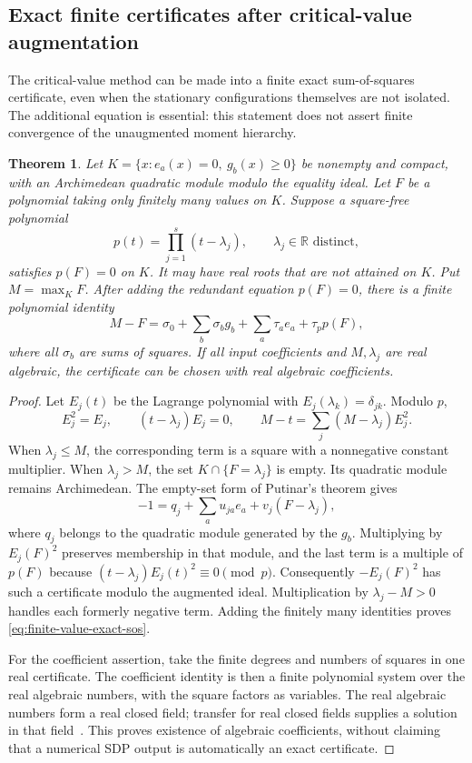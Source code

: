\documentclass[11pt]{article}
\newtheorem{theorem}{Theorem}[section]
\theoremstyle{remark}
\newcommand{\R}{\mathbb R}
\numberwithin{equation}{section}
\begin{document}
\subsection{Exact finite certificates after critical-value augmentation}
\label{sec:finite-value-sos}

The critical-value method can be made into a finite exact
sum-of-squares certificate, even when the stationary configurations
themselves are not isolated. The additional equation is essential:
this statement does not assert finite convergence of the unaugmented
moment hierarchy.

\begin{theorem}\label{thm:finite-value-sos}
Let $K=\{x:e_a(x)=0,\ g_b(x)\ge0\}$ be nonempty and compact,
with an Archimedean quadratic module modulo the equality ideal.
Let $F$ be a polynomial taking only finitely many values on $K$.
Suppose a square-free polynomial
\[
                  p(t)=\prod_{j=1}^s(t-\lambda_j),
                 \qquad \lambda_j\in\R\text{ distinct},
\]
satisfies $p(F)=0$ on $K$. It may have real roots that are not
attained on $K$. Put $M=\max_K F$. After adding the redundant
equation $p(F)=0$, there is a finite polynomial identity
\begin{equation}\label{eq:finite-value-exact-sos}
 M-F=\sigma_0+\sum_b\sigma_b g_b+\sum_a\tau_a e_a
                              +\tau_p p(F),
\end{equation}
where all $\sigma_b$ are sums of squares.
If all input coefficients and $M,\lambda_j$ are real algebraic,
the certificate can be chosen with real algebraic coefficients.
\end{theorem}
\begin{proof}
Let $E_j(t)$ be the Lagrange polynomial with
$E_j(\lambda_k)=\delta_{jk}$. Modulo $p$,
\[
 E_j^2=E_j,\qquad (t-\lambda_j)E_j=0,\qquad
              M-t=\sum_j(M-\lambda_j)E_j^2.
\]
When $\lambda_j\le M$, the corresponding term is a square with
a nonnegative constant multiplier. When $\lambda_j>M$, the set
$K\cap\{F=\lambda_j\}$ is empty. Its quadratic module remains
Archimedean. The empty-set form of Putinar's theorem gives
\[
 -1=q_j+\sum_a u_{ja}e_a+v_j(F-\lambda_j),
\]
where $q_j$ belongs to the quadratic module generated by the $g_b$.
Multiplying by $E_j(F)^2$ preserves membership in that module, and
the last term is a multiple of $p(F)$ because
$(t-\lambda_j)E_j(t)^2\equiv0\pmod p$.
Consequently $-E_j(F)^2$ has such a certificate modulo the augmented
ideal. Multiplication by $\lambda_j-M>0$ handles each formerly
negative term. Adding the finitely many identities proves
\eqref{eq:finite-value-exact-sos}.

For the coefficient assertion, take the finite degrees and numbers
of squares in one real certificate. The coefficient identity is
then a finite polynomial system over the real algebraic numbers,
with the square factors as variables. The real algebraic numbers
form a real closed field; transfer for real closed fields supplies
a solution in that field~\cite{Basu}. This proves existence of algebraic
coefficients, without claiming that a numerical SDP output is
automatically an exact certificate.
\end{proof}
\end{document}
